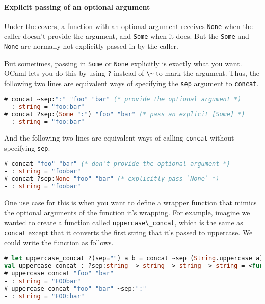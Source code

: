 \hypertarget{explicit-passing-of-an-optional-argument}{%
\paragraph{Explicit passing of an optional
argument}\label{explicit-passing-of-an-optional-argument}}

Under the covers, a function with an optional argument receives
\passthrough{\lstinline!None!} when the caller doesn't provide the
argument, and \passthrough{\lstinline!Some!} when it does. But the
\passthrough{\lstinline!Some!} and \passthrough{\lstinline!None!} are
normally not explicitly passed in by the caller.

But sometimes, passing in \passthrough{\lstinline!Some!} or
\passthrough{\lstinline!None!} explicitly is exactly what you want.
OCaml lets you do this by using \passthrough{\lstinline!?!} instead of
\passthrough{\lstinline!\~!} to mark the argument. Thus, the following
two lines are equivalent ways of specifying the
\passthrough{\lstinline!sep!} argument to
\passthrough{\lstinline!concat!}.

\begin{lstlisting}[language=Caml]
# concat ~sep:":" "foo" "bar" (* provide the optional argument *)
- : string = "foo:bar"
# concat ?sep:(Some ":") "foo" "bar" (* pass an explicit [Some] *)
- : string = "foo:bar"
\end{lstlisting}

And the following two lines are equivalent ways of calling
\passthrough{\lstinline!concat!} without specifying
\passthrough{\lstinline!sep!}.

\begin{lstlisting}[language=Caml]
# concat "foo" "bar" (* don't provide the optional argument *)
- : string = "foobar"
# concat ?sep:None "foo" "bar" (* explicitly pass `None` *)
- : string = "foobar"
\end{lstlisting}

One use case for this is when you want to define a wrapper function that
mimics the optional arguments of the function it's wrapping. For
example, imagine we wanted to create a function called
\passthrough{\lstinline!uppercase\_concat!}, which is the same as
\passthrough{\lstinline!concat!} except that it converts the first
string that it's passed to uppercase. We could write the function as
follows.

\begin{lstlisting}[language=Caml]
# let uppercase_concat ?(sep="") a b = concat ~sep (String.uppercase a) b
val uppercase_concat : ?sep:string -> string -> string -> string = <fun>
# uppercase_concat "foo" "bar"
- : string = "FOObar"
# uppercase_concat "foo" "bar" ~sep:":"
- : string = "FOO:bar"
\end{lstlisting}

